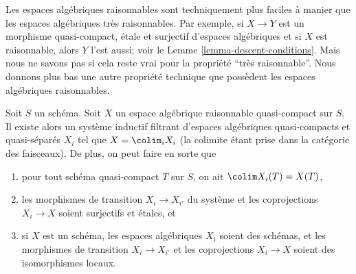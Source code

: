 \begin{remark}
\label{remark-reasonable}
Les espaces algébriques raisonnables sont techniquement plus faciles à manier
que les espaces algébriques très raisonnables. Par exemple, si $X \to Y$ est
un morphisme quasi-compact, étale et surjectif d'espaces algébriques et si
$X$ est raisonnable, alors $Y$ l'est aussi; voir le
Lemme \ref{lemma-descent-conditions}.
Mais nous ne savons pas si cela reste vrai pour la propriété
``très raisonnable''. Nous donnons plus bas une autre propriété technique
que possèdent les espaces algébriques raisonnables.
\end{remark}

\begin{lemma}
\label{lemma-fun-property-reasonable}
Soit $S$ un schéma.
Soit $X$ un espace algébrique raisonnable quasi-compact sur $S$.
Il existe alors un système inductif filtrant d'espaces algébriques
quasi-compacts et quasi-séparés $X_i$ tel que $X = \colim_i X_i$
(la colimite étant prise dans la catégorie des faisceaux). De plus, on peut
faire en sorte que
\begin{enumerate}
\item pour tout schéma quasi-compact $T$ sur $S$, on ait
$\colim X_i(T) = X(T)$,
\item les morphismes de transition $X_i \to X_{i'}$ du système et les
coprojections $X_i \to X$ soient surjectifs et étales, et
\item si $X$ est un schéma, les espaces algébriques $X_i$ soient des schémas,
et les morphismes de transition $X_i \to X_{i'}$ et les coprojections
$X_i \to X$ soient des isomorphismes locaux.
\end{enumerate}
\end{lemma}

